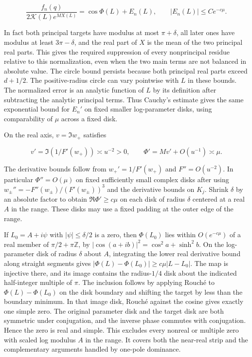 \documentclass[11pt]{article}
\begin{document}
\begin{equation*}
\frac{f_n(q)}{2\mathcal K(L)e^{MX(L)}}=\cos\Phi(L)+E_n(L),\qquad |E_n(L)|\le C e^{-c\mu}.
\end{equation*}

In fact both principal targets have modulus at most \(\pi+\delta\), all later ones have modulus at least \(3\pi-\delta\), and the real part of \(X\) is the mean of the two principal real parts. This gives the required suppression of every nonprincipal residue relative to this normalization, even when the two main terms are not balanced in absolute value. The circle bound persists because both principal real parts exceed \(d+1/2\). The positive-radius circle can vary pointwise with \(L\) in these bounds. The normalized error is an analytic function of \(L\) by its definition after subtracting the analytic principal terms. Thus Cauchy's estimate gives the same exponential bound for \(E_n'\) on fixed smaller log-parameter disks, using comparability of \(\mu\) across a fixed disk.

On the real axis, \(v=\Im w_+\) satisfies

\begin{equation*}
v'=\Im(1/F'(w_+))\asymp u^{-2}>0,
\qquad
\Phi'=Mv'+O(u^{-1})\asymp\mu .
\end{equation*}

The derivative bounds follow from \(w_+'=1/F'(w_+)\) and \(F''=O(u^{-2})\). In particular \(\Phi''=O(\mu)\) on fixed sufficiently small complex disks after using \(w_\pm''=-F''(w_\pm)/(F'(w_\pm))^3\) and the derivative bounds on \(K_j\). Shrink \(\delta\) by an absolute factor to obtain \(\Re\Phi'\ge c\mu\) on each disk of radius \(\delta\) centered at a real \(A\) in the range. These disks may use a fixed padding at the outer edge of the range.

If \(L_0=A+i\psi\) with \(|\psi|\le\delta/2\) is a zero, then \(\Phi(L_0)\) lies within \(O(e^{-c\mu})\) of a real member of \(\pi/2+\pi\mathbb Z\), by \(|\cos(a+ib)|^2=\cos^2 a+\sinh^2 b\). On the log-parameter disk of radius \(\delta\) about \(A\), integrating the lower real derivative bound along straight segments gives \(|\Phi(L)-\Phi(L_0)|\ge c\mu|L-L_0|\). The map is injective there, and its image contains the radius-\(1/4\) disk about the indicated half-integer multiple of \(\pi\). The inclusion follows by applying Rouché to \(\Phi(L)-\Phi(L_0)\) on the disk boundary and shifting the target by less than the boundary minimum. In that image disk, Rouché against the cosine gives exactly one simple zero. The original parameter disk and the target disk are both symmetric under conjugation, and the inverse phase commutes with conjugation. Hence the zero is real and simple. This excludes every nonreal or multiple zero with scaled log modulus \(A\) in the range. It covers both the near-real strip and the complementary arguments handled by one-pole dominance.
\end{document}
